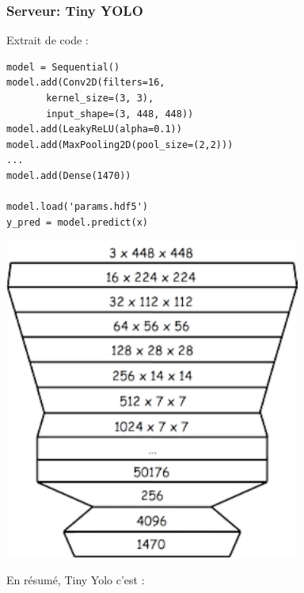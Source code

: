 \documentclass[11pt]{beamer}
\begin{document}
\begin{frame}[fragile]
\frametitle{Serveur: Tiny YOLO}
\begin{minipage}[c]{.35\linewidth}
Extrait de code :
\small{
\begin{verbatim}
model = Sequential()
model.add(Conv2D(filters=16, 
       kernel_size=(3, 3), 
       input_shape=(3, 448, 448))
model.add(LeakyReLU(alpha=0.1))
model.add(MaxPooling2D(pool_size=(2,2)))
...
model.add(Dense(1470))

model.load('params.hdf5')
y_pred = model.predict(x)
\end{verbatim}
}
   \end{minipage} 
   \hfill
   \begin{minipage}[r]{.48\linewidth}
   \begin{flushright}
 \includegraphics[width=0.73\textwidth]{images/YOLO_params.pdf}
\end{flushright}    
   \end{minipage}
\pause
\begin{alertblock}{En résumé, Tiny Yolo c'est :}
\begin{itemize}
\end{itemize}
\end{alertblock}
\end{frame}
\end{document}
